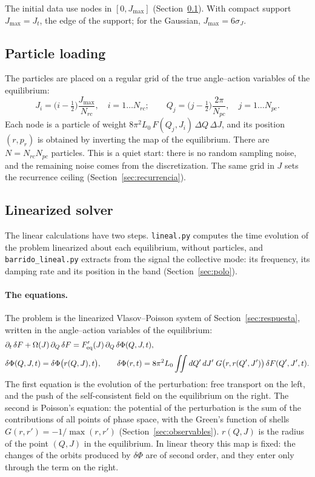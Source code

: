\documentclass[11pt,a4paper]{article}
\begin{document}
The initial data use nodes in $[0,J_{\max}]$ (Section~\ref{sec:discreto}). With compact
support $J_{\max}=J_t$, the edge of the support; for the Gaussian, $J_{\max}=6\sigma_J$.

\subsection{Particle loading}
\label{sec:discreto}

The particles are placed on a regular grid of the true angle--action variables of the
equilibrium:
\[
  J_i = \big(i-\tfrac12\big)\frac{J_{\max}}{N_{rc}},\quad i=1\ldots N_{rc};\qquad
  Q_j = \big(j-\tfrac12\big)\frac{2\pi}{N_{pc}},\quad j=1\ldots N_{pc}.
\]
Each node is a particle of weight $8\pi^2L_0\,F(Q_j,J_i)\,\Delta Q\,\Delta J$, and its position
$(r,p_r)$ is obtained by inverting the map of the equilibrium. There are $N=N_{rc}N_{pc}$
particles. This is a quiet start: there is no random sampling noise, and the remaining
noise comes from the discretization. The same grid in $J$ sets the recurrence ceiling
(Section~\ref{sec:recurrencia}).

\subsection{Linearized solver}
\label{sec:metodo_lineal}

The linear calculations have two steps. \texttt{lineal.py} computes the time evolution of
the problem linearized about each equilibrium, without particles, and
\texttt{barrido\_\allowbreak lineal.py} extracts from the signal the collective mode: its
frequency, its damping rate and its position in the band (Section~\ref{sec:polo}).

\paragraph{The equations.} The problem is the linearized Vlasov--Poisson system of
Section~\ref{sec:respuesta}, written in the angle--action variables of the equilibrium:
\begin{align}
  &\partial_t\,\delta F + \Omega(J)\,\partial_Q\,\delta F
     = F_{\rm eq}'(J)\,\partial_Q\,\delta\Phi(Q,J,t), \label{eq:vlasov_lin}\\[2pt]
  &\delta\Phi(Q,J,t) = \delta\Phi\big(r(Q,J),t\big),\qquad
   \delta\Phi(r,t) = 8\pi^2L_0\iint dQ'\,dJ'\;G\big(r,r(Q',J')\big)\,\delta F(Q',J',t).
   \label{eq:poisson_lin}
\end{align}
The first equation is the evolution of the perturbation: free transport on the left, and
the push of the self-consistent field on the equilibrium on the right. The second is
Poisson's equation: the potential of the perturbation is the sum of the contributions of
all points of phase space, with the Green's function of shells $G(r,r')=-1/\max(r,r')$
(Section~\ref{sec:observables}). $r(Q,J)$ is the radius of the point $(Q,J)$ in the
equilibrium. In linear theory this map is fixed: the changes of the orbits produced by
$\delta\Phi$ are of second order, and they enter only through the term on the right.
\end{document}
